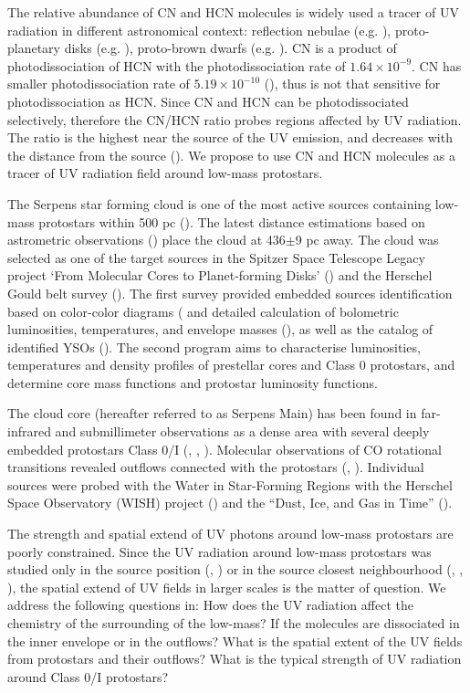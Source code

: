 \documentclass{aa}
\begin{document}
The relative abundance of CN and HCN molecules is widely used a tracer of UV radiation in different astronomical context: reflection nebulae (e.g. \citealt{Fue95}), proto-planetary disks (e.g. \citealt{Cha12}), proto-brown dwarfs (e.g. \citealt{Ria18}). CN is a product of photodissociation of HCN with the photodissociation rate of $1.64\times10^{-9}$. CN has smaller photodissociation rate of $5.19\times10^{-10}$ (\citealt{Hea17}), thus is not that sensitive for photodissociation as HCN. Since CN and HCN can be photodissociated selectively, therefore the CN/HCN ratio probes regions affected by UV radiation. The ratio is the highest near the source of the UV emission, and decreases with the distance from the source (\citealt{Fue93}). We propose to use CN and HCN molecules as a tracer of UV radiation field around low-mass protostars.

The Serpens star forming cloud is one of the most active sources containing low-mass protostars within 500 pc (\citealt{Eva09}). The latest distance estimations based on astrometric observations (\citealt{Ort17}) place the cloud at 436$\pm$9 pc away. The cloud was selected as one of the target sources in the Spitzer Space Telescope Legacy project ‘From Molecular Cores to Planet-forming Disks’ (\citealt{Eva03}) and the Herschel Gould belt survey (\citealt{And10}). The first survey provided embedded sources identification based on color-color diagrams (\citealt{Har07} and detailed calculation of bolometric luminosities, temperatures, and envelope masses (\citealt{Eno09}), as well as the catalog of identified YSOs (\citealt{Dun15}). The second program aims to characterise luminosities, temperatures and density profiles of prestellar cores and Class 0 protostars, and determine core mass functions and protostar luminosity functions.

The cloud core (hereafter referred to as Serpens Main) has been found in far-infrared and submillimeter observations as a dense area with several deeply embedded protostars Class 0/I (\citealt{Cas93}, \citealt{Hur96}, \citealt{Tes98}). Molecular observations of CO rotational transitions revealed outflows connected with the protostars (\citealt{Dav99}, \citealt{Dio10}). Individual sources were probed with the Water in Star-Forming Regions with the Herschel Space Observatory (WISH) project (\citealt{vDi11}) and the “Dust, Ice, and Gas in Time” (\citealt{Gre13}). 

The strength and spatial extend of UV photons around low-mass protostars are poorly constrained. Since the UV radiation around low-mass protostars was studied only in the source position (\citealt{Sta07}, \citealt{Ria18}) or in the source closest neighbourhood (\citealt{Hog99}, \citealt{Bac01}, \citealt{Jor04}), the spatial extend of UV fields in larger scales is the matter of question. We address the following questions in: How does the UV radiation affect the chemistry of the surrounding of the low-mass? If the molecules are dissociated in the inner envelope or in the outflows? What is the spatial extent of the UV fields from protostars and their outflows? What is the typical strength of UV radiation around Class 0/I protostars? 
\end{document}

